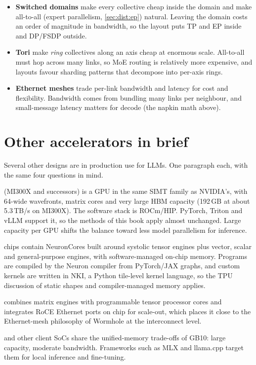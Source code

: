 \begin{itemize}
  \item \textbf{Switched domains} make every collective cheap inside the domain and make
    all-to-all (expert parallelism, \cref{sec:dist:ep}) natural. Leaving the domain costs an
    order of magnitude in bandwidth, so the layout puts TP and EP inside and DP/FSDP outside.
  \item \textbf{Tori} make \emph{ring} collectives along an axis cheap at enormous scale. All-to-all
    must hop across many links, so MoE routing is relatively more expensive, and layouts favour
    sharding patterns that decompose into per-axis rings.
  \item \textbf{Ethernet meshes} trade per-link bandwidth and latency for cost and flexibility.
    Bandwidth comes from bundling many links per neighbour, and small-message latency matters for
    decode (the napkin math above).
\end{itemize}

\section{Other accelerators in brief}\label{sec:accel:others}

Several other designs are in production use for LLMs. One paragraph each, with the same four
questions in mind.
\begin{description}[leftmargin=1.9cm, style=nextline]
  \item[AMD Instinct] (MI300X and successors) is a GPU in the same SIMT family as NVIDIA's, with 64-wide
    wavefronts, matrix cores and very large HBM capacity (192\,GB at about 5.3\,TB/s on MI300X).
    The software stack is ROCm/HIP. PyTorch, Triton and vLLM support it, so the methods of this book apply
    almost unchanged. Large capacity per GPU shifts the balance toward less model parallelism for
    inference.
  \item[AWS Trainium] chips contain NeuronCores built around systolic tensor engines plus vector,
    scalar and general-purpose engines, with software-managed on-chip memory. Programs are compiled by
    the Neuron compiler from PyTorch/JAX graphs, and custom kernels are written in NKI, a Python
    tile-level kernel language, so the TPU discussion of static shapes and compiler-managed memory
    applies.
  \item[Intel Gaudi] combines matrix engines with programmable tensor processor cores and integrates
    RoCE Ethernet ports on chip for scale-out, which places it close to the Ethernet-mesh philosophy of
    Wormhole at the interconnect level.
  \item[Apple silicon] and other client SoCs share the unified-memory trade-offs of GB10: large
    capacity, moderate bandwidth. Frameworks such as MLX and llama.cpp target them for local
    inference and fine-tuning.
\end{description}

